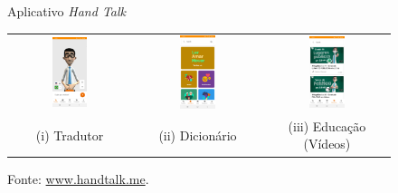\begin{figure}[htbp]
\centering
\caption{Aplicativo \textit{Hand Talk}}
\label{proposal:handtalk}
\begin{tabular}{ccc}
\includegraphics[width=0.3\textwidth]{images/handtalk-01.jpg} & \includegraphics[width=0.3\textwidth]{images/handtalk-02.jpg} & \includegraphics[width=0.3\textwidth]{images/handtalk-03.jpg}\\
(i) Tradutor & (ii) Dicionário & (iii) Educação (Vídeos) \\
\end{tabular}
\caption*{Fonte: \url{www.handtalk.me}.}
\end{figure}

